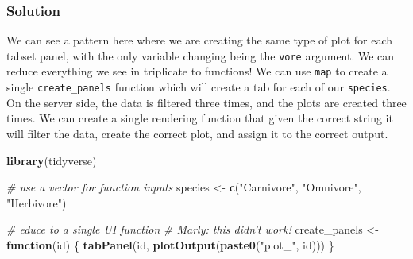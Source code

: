 \documentclass[]{book}
\newenvironment{Shaded}{\begin{snugshade}}{\end{snugshade}}
\newcommand{\CommentTok}[1]{\textcolor[rgb]{0.56,0.35,0.01}{\textit{#1}}}
\newcommand{\ControlFlowTok}[1]{\textcolor[rgb]{0.13,0.29,0.53}{\textbf{#1}}}
\newcommand{\KeywordTok}[1]{\textcolor[rgb]{0.13,0.29,0.53}{\textbf{#1}}}
\newcommand{\NormalTok}[1]{#1}
\newcommand{\StringTok}[1]{\textcolor[rgb]{0.31,0.60,0.02}{#1}}
\begin{document}
\begin{solution}

\hypertarget{solution}{%
\subsubsection*{Solution}\label{solution}}

We can see a pattern here where we are creating the same type of plot for each tabset panel, with the only variable changing being the \texttt{vore} argument. We can reduce everything we see in triplicate to functions! We can use \texttt{map} to create a single \texttt{create\_panels} function which will create a tab for each of our \texttt{species}. On the server side, the data is filtered three times, and the plots are created three times. We can create a single rendering function that given the correct string it will filter the data, create the correct plot, and assign it to the correct output.

\begin{Shaded}
\begin{Highlighting}[]
\KeywordTok{library}\NormalTok{(tidyverse)}

\CommentTok{# use a vector for function inputs}
\NormalTok{species <-}\StringTok{ }\KeywordTok{c}\NormalTok{(}\StringTok{"Carnivore"}\NormalTok{, }\StringTok{"Omnivore"}\NormalTok{, }\StringTok{"Herbivore"}\NormalTok{)}

\CommentTok{# educe to a single UI function}
\CommentTok{# Marly: this didn't work!}
\NormalTok{create_panels <-}\StringTok{ }\ControlFlowTok{function}\NormalTok{(id) \{}
    \KeywordTok{tabPanel}\NormalTok{(id, }\KeywordTok{plotOutput}\NormalTok{(}\KeywordTok{paste0}\NormalTok{(}\StringTok{"plot_"}\NormalTok{, id)))}
\NormalTok{\}}


\end{Highlighting}
\end{Shaded}
\end{solution}
\end{document}
